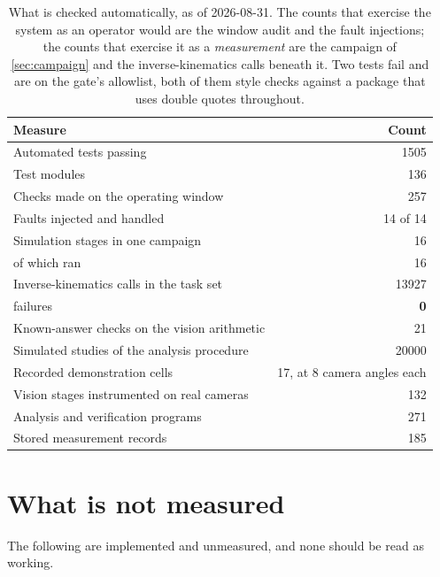 \begin{table}[htbp]
  \centering
  \caption[Verification totals]{What is checked automatically, as of
  2026-08-31. The counts that exercise the system as an operator would are
  the window audit and the fault injections; the counts that exercise it as a
  \emph{measurement} are the campaign of \cref{sec:campaign} and the
  inverse-kinematics calls beneath it. Two tests fail and are on the gate's
  allowlist, both of them style checks against a package that uses double
  quotes throughout.}
  \label{tab:verification}
  \begin{tabular}{@{}lr@{}}
    \toprule
    Measure & Count \\
    \midrule
    Automated tests passing & \num{1505} \\
    Test modules & \num{136} \\
    Checks made on the operating window & \num{257} \\
    Faults injected and handled & 14 of 14 \\
    \midrule
    Simulation stages in one campaign & \num{16} \\
    \quad of which ran & \num{16} \\
    Inverse-kinematics calls in the task set & \num{13927} \\
    \quad failures & \textbf{0} \\
    Known-answer checks on the vision arithmetic & \num{21} \\
    Simulated studies of the analysis procedure & \num{20000} \\
    \midrule
    Recorded demonstration cells & 17, at 8 camera angles each \\
    Vision stages instrumented on real cameras & \num{132} \\
    Analysis and verification programs & \num{271} \\
    Stored measurement records & \num{185} \\
    \bottomrule
  \end{tabular}
\end{table}

\section{What is not measured}

The following are implemented and unmeasured, and none should be read as
working.

